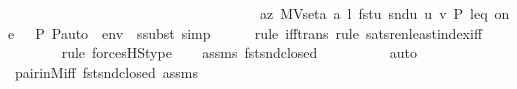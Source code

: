 \begin{isabellebody}
\ \ \ \ \ \ \ \ \ \ \ \ \ \ \ \ \ \ \ \ \ \ \ \ \ \ \ \ \ \ \ \ \ \ \ \ a{\isacharequal}{\kern0pt}{\isachardoublequoteopen}{\isacharbrackleft}{\kern0pt}z{\isacharcomma}{\kern0pt}\ MVset{\isacharparenleft}{\kern0pt}a{\isacharparenright}{\kern0pt}{\isacharcomma}{\kern0pt}\ a{\isacharcomma}{\kern0pt}\ l{\isacharcomma}{\kern0pt}\ fst{\isacharparenleft}{\kern0pt}u{\isacharparenright}{\kern0pt}{\isacharcomma}{\kern0pt}\ snd{\isacharparenleft}{\kern0pt}u{\isacharparenright}{\kern0pt}{\isacharcomma}{\kern0pt}\ u{\isacharcomma}{\kern0pt}\ v{\isacharcomma}{\kern0pt}\ P{\isacharcomma}{\kern0pt}\ leq{\isacharcomma}{\kern0pt}\ one{\isacharcomma}{\kern0pt}\ {\isasymlangle}{\isasymF}{\isacharcomma}{\kern0pt}\ {\isasymG}{\isacharcomma}{\kern0pt}\ P{\isacharcomma}{\kern0pt}\ P{\isacharunderscore}{\kern0pt}auto{\isasymrangle}{\isacharbrackright}{\kern0pt}\ {\isacharat}{\kern0pt}\ env{\isachardoublequoteclose}\ \ ssubst{\isacharcomma}{\kern0pt}\ simp{\isacharparenright}{\kern0pt}\isanewline
\ \ \ \ \ \isamarkupfalse%
{\isacharparenleft}{\kern0pt}rule\ iff{\isacharunderscore}{\kern0pt}trans{\isacharcomma}{\kern0pt}\ rule\ sats{\isacharunderscore}{\kern0pt}ren{\isacharunderscore}{\kern0pt}least{\isacharunderscore}{\kern0pt}index{\isacharunderscore}{\kern0pt}iff{\isacharparenright}{\kern0pt}\isanewline
\ \ \ \ \ \ \ \isamarkupfalse%
{\isacharparenleft}{\kern0pt}rule\ forcesHS{\isacharunderscore}{\kern0pt}type{\isacharparenright}{\kern0pt}\isanewline
\ \ \isamarkupfalse%
\ assms\ fst{\isacharunderscore}{\kern0pt}snd{\isacharunderscore}{\kern0pt}closed\ \isanewline
\ \ \ \ \ \ \ \isamarkupfalse%
\ auto{\isacharbrackleft}{\kern0pt}{}{\isacharbrackright}{\kern0pt}\isanewline
\ \ \isamarkupfalse%
\ pair{\isacharunderscore}{\kern0pt}in{\isacharunderscore}{\kern0pt}M{\isacharunderscore}{\kern0pt}iff\ fst{\isacharunderscore}{\kern0pt}snd{\isacharunderscore}{\kern0pt}closed\ assms\isanewline
\ \ \ \isamarkupfalse%

\end{isabellebody}
